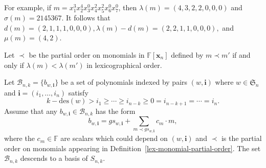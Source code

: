 \documentclass[ALCO,ThmDefs,published]{cedram}
\newcommand{\symm}{{\mathfrak{S}}}
\newcommand{\xx}{{\mathbf {x}}}
\newcommand{\FF}{{\mathbb{F}}}
\theoremstyle{plain}
\newcommand{\inv}{{\mathrm {inv}}}
\newcommand{\des}{{\mathrm {des}}}
\newcommand{\neglex}{{\mathtt {neglex}}}
\newcommand{\symm}{{\mathfrak{S}}}
\newcommand{\FF}{{\mathbb{F}}}
\newcommand{\BBB}{{\mathcal{B}}}
\newcommand{\GS}{{\mathcal{GS}}}
\newcommand{\xx}{{\mathbf {x}}}
\newcommand{\ii}{{\mathbf{i}}}
\begin{document}
For example, if $m = x_1^3 x_2^4 x_3^0 x_4^2 x_5^2 x_6^0 x_7^0$, then 
$\lambda(m) = (4,3,2,2,0,0,0)$ and $\sigma(m) = 2145367$.  It follows that 
$d(m) = (2,1,1,1,0,0,0), \lambda(m) - d(m) = (2,2,1,1,0,0,0),$ and 
$\mu(m) = (4,2)$.

\begin{defn}
\label{lex-monomial-partial-order}
Let $\prec$ be the partial order on monomials in $\FF[\xx_n]$ defined by $m \prec m'$ if and only if 
$\lambda(m) < \lambda(m')$ in lexicographical order.
\end{defn}




\begin{lemma}
\label{garsia-stanton-type-bases}
Let $\BBB_{n,k} = \{b_{w,\ii}\}$ be a set of polynomials indexed by pairs $(w, \ii)$ where $w \in \symm_n$
and $\ii = (i_1, \dots, i_n)$ satisfy 
\begin{equation*}
k - \des(w) > i_1 \geq \cdots \geq i_{n-k} \geq 0 = i_{n-k+1} = \cdots = i_n.  
\end{equation*}
Assume that any $b_{w,\ii} \in \BBB_{n,k}$
has the form
\begin{equation}
b_{w,\ii} = gs_{w,\ii} + \sum_{m \prec gs_{w,\ii}} c_m \cdot m,
\end{equation}
where the $c_m \in \FF$ are scalars which could depend on $(w,\ii)$ and $\prec$ is the partial
order on monomials appearing in Definition~\ref{lex-monomial-partial-order}. The set $\BBB_{n,k}$ descends to a basis of $S_{n,k}$.
\end{lemma}

\end{document}
